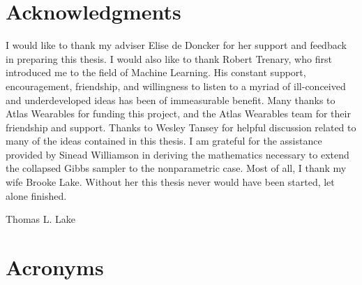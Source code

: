 \documentclass[12pt]{report}
\newcommand{\1}[0]{\mathbbm{1}}
\begin{document}
\chapter*{Acknowledgments}
I would like to thank my adviser Elise de Doncker for her support and feedback
in preparing this thesis.
I would also like to thank Robert Trenary, who first introduced me to the field of
Machine Learning.
His constant support, encouragement, friendship, and willingness to
listen to a myriad of ill-conceived and underdeveloped ideas has been of immeasurable benefit.
Many thanks to Atlas Wearables for funding this project, and the Atlas Wearables team for their
friendship and support.
Thanks to Wesley Tansey for helpful discussion related to many of the ideas contained in this thesis.
I am grateful for the assistance provided by Sinead Williamson in deriving the mathematics
necessary to extend the collapsed Gibbs sampler to the nonparametric case.
Most of all, I thank my wife Brooke Lake. Without her this thesis never would have
been started, let alone finished.

\vspace{3\baselineskip}

\hspace*{0.5\textwidth}Thomas L. Lake


\tableofcontents

\cleardoublepage
{}
\listoftables

\cleardoublepage
{}
\listoffigures

\cleardoublepage
{}
\chapter*{Acronyms}
\begin{acronym}[XXXXXXXXX]
\end{acronym}
\end{document}
